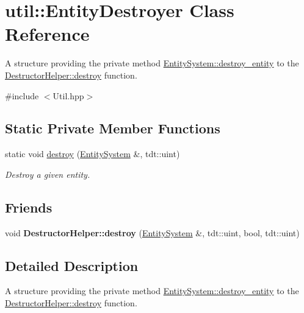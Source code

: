 \hypertarget{classutil_1_1_entity_destroyer}{}\section{util\+:\+:Entity\+Destroyer Class Reference}
\label{classutil_1_1_entity_destroyer}


A structure providing the private method \hyperlink{class_entity_system_a4ecd6127995602d98736cd1cf5799c11}{Entity\+System\+::destroy\+\_\+entity} to the \hyperlink{namespace_destructor_helper_a93b8f71a2769c231679141fcef275bdb}{Destructor\+Helper\+::destroy} function.  




{\ttfamily \#include $<$Util.\+hpp$>$}

\subsection*{Static Private Member Functions}
\begin{DoxyCompactItemize}
\item 
static void \hyperlink{classutil_1_1_entity_destroyer_ae6df56bd2fc643398bf1de3155d0c71a}{destroy} (\hyperlink{class_entity_system}{Entity\+System} \&, tdt\+::uint)
\begin{DoxyCompactList}\small\item\em Destroy a given entity. \end{DoxyCompactList}\end{DoxyCompactItemize}
\subsection*{Friends}
\begin{DoxyCompactItemize}
\item 
void {\bfseries Destructor\+Helper\+::destroy} (\hyperlink{class_entity_system}{Entity\+System} \&, tdt\+::uint, bool, tdt\+::uint)\hypertarget{classutil_1_1_entity_destroyer_a43c94aa2e0a779761e17a5b17ce6d83a}{}\label{classutil_1_1_entity_destroyer_a43c94aa2e0a779761e17a5b17ce6d83a}

\end{DoxyCompactItemize}


\subsection{Detailed Description}
A structure providing the private method \hyperlink{class_entity_system_a4ecd6127995602d98736cd1cf5799c11}{Entity\+System\+::destroy\+\_\+entity} to the \hyperlink{namespace_destructor_helper_a93b8f71a2769c231679141fcef275bdb}{Destructor\+Helper\+::destroy} function. 

